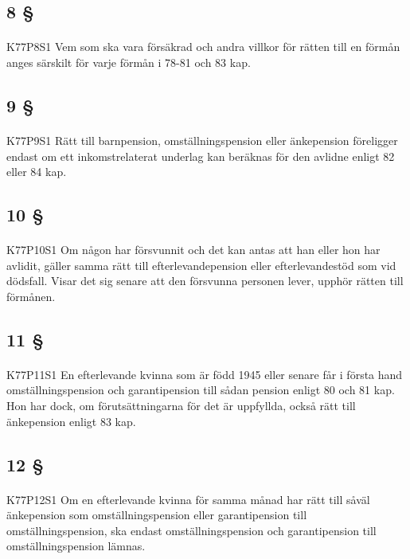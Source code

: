 \documentclass[a4paper,notitlepage,openany,10pt]{book}
\begin{document}
\subsection*{8 §}
\paragraph*{}
{\tiny K77P8S1}
Vem som ska vara försäkrad och andra villkor för rätten till en förmån anges särskilt för varje förmån i 78-81 och 83 kap.
\subsection*{9 §}
\paragraph*{}
{\tiny K77P9S1}
Rätt till barnpension, omställningspension eller änkepension föreligger endast om ett inkomstrelaterat underlag kan beräknas för den avlidne enligt 82 eller 84 kap.
\subsection*{10 §}
\paragraph*{}
{\tiny K77P10S1}
Om någon har försvunnit och det kan antas att han eller hon har avlidit, gäller samma rätt till efterlevandepension eller efterlevandestöd som vid dödsfall. Visar det sig senare att den försvunna personen lever, upphör rätten till förmånen.
\subsection*{11 §}
\paragraph*{}
{\tiny K77P11S1}
En efterlevande kvinna som är född 1945 eller senare får i första hand omställningspension och garantipension till sådan pension enligt 80 och 81 kap. Hon har dock, om förutsättningarna för det är uppfyllda, också rätt till änkepension enligt 83 kap.
\subsection*{12 §}
\paragraph*{}
{\tiny K77P12S1}
Om en efterlevande kvinna för samma månad har rätt till såväl änkepension som omställningspension eller garantipension till omställningspension, ska endast omställningspension och garantipension till omställningspension lämnas.
\end{document}
